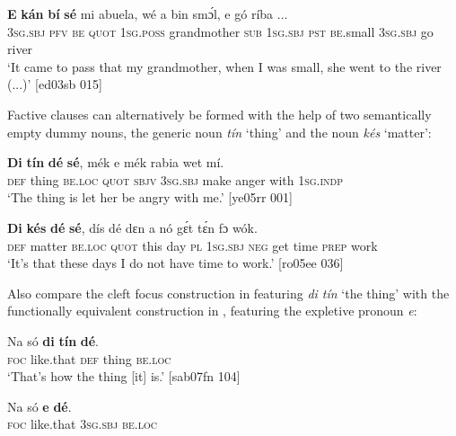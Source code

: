 \ea%
    \label{ex:key:1135}
    \gll \textbf{E}    \textbf{kán}  \textbf{bí}  \textbf{sé}    mi    abuela,    wé  a
bin  smɔ́l,  e    gó  ríba    \op...\cp{}\\
\textsc{3sg.sbj}  \textsc{pfv}  \textsc{be}  \textsc{quot}    \textsc{1sg.poss}  grandmother  \textsc{sub}  \textsc{1sg.sbj}
\textsc{pst}  \textsc{be}.small  \textsc{3sg.sbj}  go  river\\

\glt ‘It came to pass that my grandmother, when I was small, 
she went to the river (...)’ [ed03sb 015]
\z

Factive clauses can alternatively be formed with the help of two semantically empty dummy nouns, the generic noun \textit{tín} ‘thing’ and the noun \textit{kés} ‘matter’:


\ea%
    \label{ex:key:1136}
    \gll \textbf{Di}  \textbf{tín}    \textbf{dé}    \textbf{sé},    mék    e    mék    rabia  wet    mí.\\
\textsc{def}  thing  \textsc{be.loc}  \textsc{quot}    \textsc{sbjv}    \textsc{3sg.sbj}  make  anger  with    \textsc{1sg.indp}\\

\glt ‘The thing is let her be angry with me.’ [ye05rr 001]
\z


\ea%
    \label{ex:key:1137}
    \gll \textbf{Di}  \textbf{kés}    \textbf{dé}    \textbf{sé},    dís  dé  dɛn  a    nó  gɛ́t  tɛ́n
fɔ  wók.\\
\textsc{def}  matter  \textsc{be.loc}  \textsc{quot}    this  day  \textsc{pl}  \textsc{1sg.sbj}  \textsc{neg}  get  time
\textsc{prep}  work\\
\glt ‘It’s that these days I do not have time to work.’ [ro05ee 036]
\z

Also compare the cleft focus construction in  featuring \textit{di tín} ‘the thing’ with the functionally equivalent construction in , featuring the expletive pronoun \textit{e}:


\ea%
    \label{ex:key:1138}
    \gll Na  só    \textbf{di}  \textbf{tín}    \textbf{dé}.\\
\textsc{foc}  like.that  \textsc{def}  thing  \textsc{be.loc}\\

\glt ‘That’s how the thing [it] is.’ [sab07fn 104]
\z


\ea%
    \label{ex:key:1139}
    \gll Na  só    \textbf{e}    \textbf{dé}.\\
\textsc{foc}  like.that  \textsc{3sg.sbj}  \textsc{be.loc}\\

